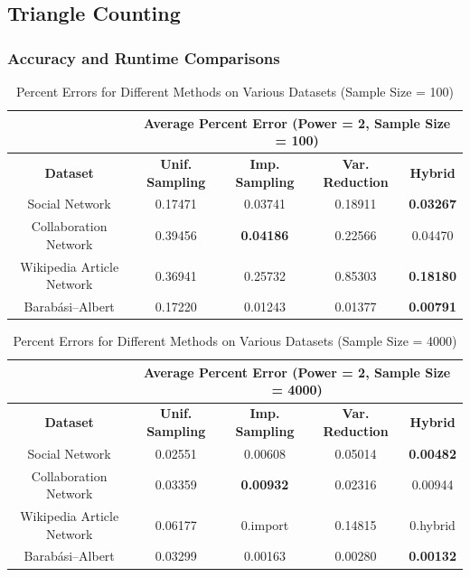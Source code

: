 \documentclass[11pt]{article}
\begin{document}
\subsection{Triangle Counting}

\subsubsection{Accuracy and Runtime Comparisons}

\begin{table}[ht]
\centering
\begin{tabular}{|c|c|c|c|c|}
\hline
& \multicolumn{4}{c|}{\textbf{Average Percent Error (Power = 2, Sample Size = 100)}} \\
\hline
\textbf{Dataset} & \textbf{Unif. Sampling} & \textbf{Imp. Sampling} & \textbf{Var. Reduction} & \textbf{Hybrid} \\
\hline
Social Network & 0.17471 & 0.03741 & 0.18911 & \textbf{0.03267} \\
Collaboration Network & 0.39456 & \textbf{0.04186} & 0.22566 & 0.04470 \\
Wikipedia Article Network & 0.36941 & 0.25732 & 0.85303 & \textbf{0.18180} \\
Barabási–Albert & 0.17220 & 0.01243 & 0.01377 & \textbf{0.00791} \\
\hline
\end{tabular}
\caption{Percent Errors for Different Methods on Various Datasets (Sample Size = 100)}
\end{table}

\begin{table}[ht]
\centering
\begin{tabular}{|c|c|c|c|c|}
\hline
& \multicolumn{4}{c|}{\textbf{Average Percent Error (Power = 2, Sample Size = 4000)}} \\
\hline
\textbf{Dataset} & \textbf{Unif. Sampling} & \textbf{Imp. Sampling} & \textbf{Var. Reduction} & \textbf{Hybrid} \\
\hline
Social Network & 0.02551 & 0.00608 & 0.05014 & \textbf{0.00482} \\
Collaboration Network & 0.03359 & \textbf{0.00932} & 0.02316 & 0.00944 \\
Wikipedia Article Network & 0.06177 & 0.import & 0.14815 & 0.hybrid \\
Barabási–Albert & 0.03299 & 0.00163 & 0.00280 & \textbf{0.00132} \\
\hline
\end{tabular}
\caption{Percent Errors for Different Methods on Various Datasets (Sample Size = 4000)}
\end{table}
\end{document}
